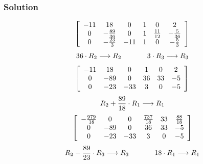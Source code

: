 \documentclass[xcolor=dvipsnames]{beamer}
\begin{document}
\begin{frame}
  \frametitle{Solution}
  \begin{equation}
    \label{eq:viedixee}
    \left[
      \begin{array}{cccccc}
        -11 & 18  & 0 & 1 & 0 & 2 \\
         0 & -\frac{89}{36} & 0  & 1 & \frac{11}{12} & -\frac{5}{36} \\
        0 & -\frac{23}{3}  & -11  & 1 & 0 & -\frac{5}{3}
      \end{array}\right]\notag
  \end{equation}
  \begin{equation}
    \label{eq:laiwoami}
    36\cdot{}R_{2}\longrightarrow{}R_{2}\hspace{.5in}3\cdot{}R_{3}\longrightarrow{}R_{3}\notag
  \end{equation}
  \begin{equation}
    \label{eq:huajahng}
    \left[
      \begin{array}{cccccc}
        -11 & 18  & 0 & 1 & 0 & 2 \\
         0 & -89 & 0  & 36 & 33 & -5 \\
        0 & -23  & -33  & 3 & 0 & -5
      \end{array}\right]\notag
  \end{equation}
  \begin{equation}
    \label{eq:naesahto}
R_{2}+\frac{89}{18}\cdot{}R_{1}\longrightarrow{}R_{1}\notag    
  \end{equation}
  \begin{equation}
    \label{eq:yohteihu}
    \left[
      \begin{array}{cccccc}
        -\frac{979}{18} & 0  & 0 & \frac{737}{18} & 33 & \frac{88}{18} \\
         0 & -89 & 0  & 36 & 33 & -5 \\
        0 & -23  & -33  & 3 & 0 & -5
      \end{array}\right]\notag
  \end{equation}
  \begin{equation}
    \label{eq:ajiuteeb}
R_{2}-\frac{89}{23}\cdot{}R_{3}\longrightarrow{}R_{3}\hspace{.5in}18\cdot{}R_{1}\longrightarrow{}R_{1}\notag     
  \end{equation}
\end{frame}
\end{document}
